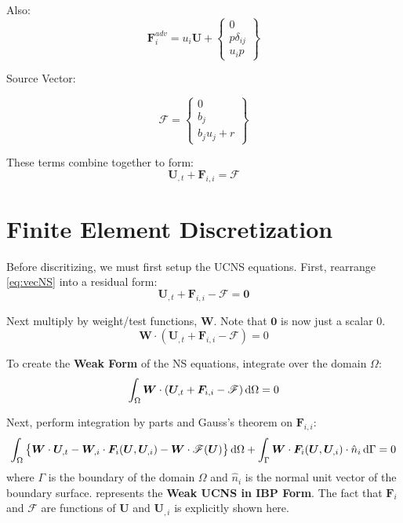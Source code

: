 \documentclass[12pt, letterpaper, twoside]{article}
\renewcommand{\vec}[1]{\bm{#1}}
\newcommand{\U}{\vec{U}}
\newcommand{\F}{\vec{F}}
\newcommand{\W}{\vec{W}}
\newcommand{\src}{\vec{\mathscr{F}}}
\begin{document}
    Also:
    \begin{equation}
        \F_i^{adv}  = 
        u_i \U
        + \begin{Bmatrix}
            0 \\
            p \delta_{ij}\\
            u_i p
        \end{Bmatrix} 
    \end{equation}

    Source Vector:

    \begin{equation}
        \src = 
        \begin{Bmatrix}
            0 \\
            b_j \\
            b_j u_j + r
        \end{Bmatrix}
    \end{equation}

    These terms combine together to form:
    \begin{equation} \label{eq:vecNS}
        \U_{,t} + \F_{i,i} = \src
    \end{equation}

\section{Finite Element Discretization}

    Before discritizing, we must first setup the UCNS equations. First, rearrange \cref{eq:vecNS} into a residual form:
    \begin{equation}
        \U_{,t} + \F_{i,i} - \src = \vec{0}
    \end{equation}

    Next multiply by weight/test functions, \(\W\). Note that \(\vec{0}\) is now just a scalar 0.
    \begin{equation}
        \W \cdot ( \U_{,t} + \F_{i,i} - \src )= 0
    \end{equation}

    To create the \textbf{Weak Form} of the NS equations, integrate over the domain \(\Omega\):
    \begin{equation}
        \int_\Omega \W \cdot (\U_{,t} + \F_{i,i} - \src) \dif \Omega= 0
    \end{equation}

    Next, perform integration by parts and Gauss's theorem on \(\F_{i,i}\):
    \begin{equation} \label{eq:weakUCNS_IBP}
        \int_\Omega \left\{\W \cdot \U_{,t} - \W_{,i} \cdot \F_i(\U, \U_{,i}) - \W \cdot \src(\U) \right\} \dif \Omega 
        + \int_\Gamma \W \cdot \F_i(\U, \U_{,i}) \cdot \hat n_i \dif\Gamma= 0
    \end{equation}
    where \(\Gamma\) is the boundary of the domain \(\Omega\) and \(\hat n_i\) is the normal unit vector of the boundary surface.  represents the \textbf{Weak UCNS in IBP Form}. The fact that \(\F_i\) and \(\src\) are functions of \(\U\) and \(\U_{,i}\) is explicitly shown here.
\end{document}
